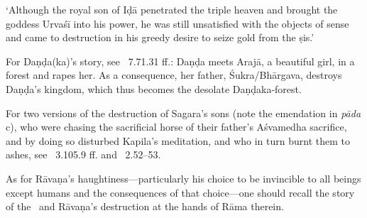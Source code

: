 {{ 
  `Although the royal son of Iḍā penetrated the triple heaven and brought
  the goddess Urvaśī into his power, he was still unsatisfied with the 
  objects of sense and came to destruction in his greedy desire to seize
  gold from the ṣis.'
  
 
  For Daṇḍa{\rm (}ka{\rm )}'s story, see \RAMAYANA\ 7.71.31 ff.:
  Daṇḍa meets Arajā, a beautiful girl, in a forest and rapes her. As a consequence, 
  her father, Śukra/Bhārgava, destroys Daṇḍa's kingdom, which thus
  becomes the desolate Daṇḍaka-forest.
 
  
 
  For two versions of the destruction of
  Sagara's sons {\rm (}note the emendation in \textit{pāda} c{\rm )}, 
  who were chasing the sacrificial horse of their father's Aśvamedha sacrifice,
  and by doing so disturbed Kapila's meditation, and who in turn burnt them to ashes,
  see \MBH~3.105.9 ff. and \BrahmandaPur\ 2.52--53.
 
  
 
  As for Rāvaṇa's haughtiness---particularly his choice to be invincible to all 
  beings except humans and the consequences of that choice---one should recall the 
  story of the \Ramayana\ and Rāvaṇa's destruction at the hands of Rāma therein.
 }}


